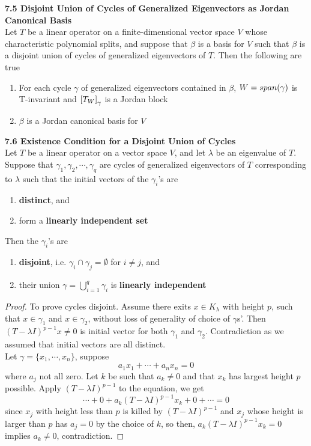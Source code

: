 \documentclass[11pt]{article}
\begin{document}
\begin{theorem*}
    \textbf{7.5 Disjoint Union of Cycles of Generalized Eigenvectors as Jordan Canonical Basis} \\
    Let $T$ be a linear operator on a finite-dimensional vector space $V$ whose characteristic polynomial splits, and suppose that $\beta$ is a basis for $V$ such that $\beta$ is a disjoint union of cycles of generalized eigenvectors of $T$. Then the following are true 
    \begin{enumerate}
        \item For each cycle $\gamma$ of generalized eigenvectors contained in $\beta$, $W = span(\gamma)$ is T-invariant and $\left[ T_W \right]_{\gamma}$ is a Jordan block 
        \item $\beta$ is a Jordan canonical basis for $V$
    \end{enumerate}
\end{theorem*}

\begin{theorem*}
    \textbf{7.6 Existence Condition for a Disjoint Union of Cycles} \\ 
    Let $T$ be a linear operator on a vector space $V$, and let $\lambda$ be an eigenvalue of $T$. Suppose that $\gamma_1, \gamma_2, \cdots, \gamma_q$ are cycles of generalized eigenvectors of $T$ corresponding to $\lambda$ such that the initial vectors of the $\gamma_i$'s are 
    \begin{enumerate}
        \item \textbf{distinct}, and
        \item form a \textbf{linearly independent set}
    \end{enumerate}
     Then the $\gamma_i$'s are 
     \begin{enumerate}
         \item \textbf{disjoint}, i.e. $\gamma_i \cap \gamma_j = \emptyset$ for $i\neq j$, and
         \item their union $\gamma = \bigcup_{i=1}^q \gamma_i$ is \textbf{linearly independent}
     \end{enumerate}
     \begin{proof}
        To prove cycles disjoint. Assume there exits $x\in K_{\lambda}$ with height $p$, such that $x\in \gamma_1$ and $x\in \gamma_2$, without loss of generality of choice of $\gamma$s'. Then $(T-\lambda I)^{p-1} x \neq 0$ is initial vector for both $\gamma_1$ and $\gamma_2$. Contradiction as we assumed that initial vectors are all distinct. \\
        Let $\gamma = \{x_1, \cdots, x_n\}$, suppose
        \[
        a_1 x_1 + \cdots + a_n x_n = 0 
        \]
        where $a_j$ not all zero. Let $k$ be such that $a_k \neq 0$ and that $x_k$ has largest height $p$ possible. Apply $(T-\lambda I)^{p-1}$ to the equation, we get 
        \[
        \cdots + 0 + a_k (T - \lambda I)^{p-1} x_k + 0 + \cdots = 0
        \]
        since $x_j$ with height less than $p$ is killed by $(T-\lambda I)^{p-1}$ and $x_j$ whose height is larger than $p$ has $a_j = 0$ by the choice of $k$, so then, $a_k (T-\lambda I)^{p-1} x_k = 0$ implies $a_k \neq 0$, contradiction.
     \end{proof}
\end{theorem*}
 
\end{document}
